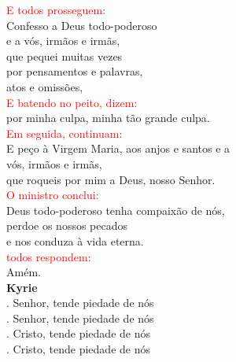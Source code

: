 \documentclass{book}
\begin{document}
\begin{flushleft}
    \textcolor{red}{E todos prosseguem:}
    \vspace{.1cm} \\
    Confesso a Deus todo-poderoso \\
    e a vós, irmãos e irmãs, \\
    que pequei muitas vezes \\
    por pensamentos e palavras, \\
    atos e omissões,
    \vspace{.1cm} \\
    \textcolor{red}{E batendo no peito, dizem:}
    \vspace{.1cm} \\
    por minha culpa, minha tão grande culpa.
    \vspace{.1cm} \\
    \textcolor{red}{Em seguida, continuam:}
    \vspace{.1cm} \\
    E peço à Virgem Maria, aos anjos e santos e a \\
    vós, irmãos e irmãs, \\
    que roqueis por mim a Deus, nosso Senhor.
    \vspace{.1cm} \\
    \textcolor{red}{O ministro conclui:}
    \vspace{.1cm} \\
    Deus todo-poderoso tenha compaixão de nós, \\
    perdoe os nossos pecados \\
    e nos conduza à vida eterna.
    \vspace{.1cm} \\
    \textcolor{red}{todos respondem:}
    \vspace{.1cm} \\
    Amém.
    \vspace{.2cm} \\
    \textbf{Kyrie}
    \vspace{.2cm} \\
    {\color{red} \Vbar.} Senhor, tende piedade de nós \\
    {\color{red} \Rbar.} Senhor, tende piedade de nós
    \vspace{.1cm} \\
    {\color{red} \Vbar.} Cristo, tende piedade de nós \\
    {\color{red} \Rbar.} Cristo, tende piedade de nós
    \vspace{.1cm} \\

\end{flushleft}
\end{document}
